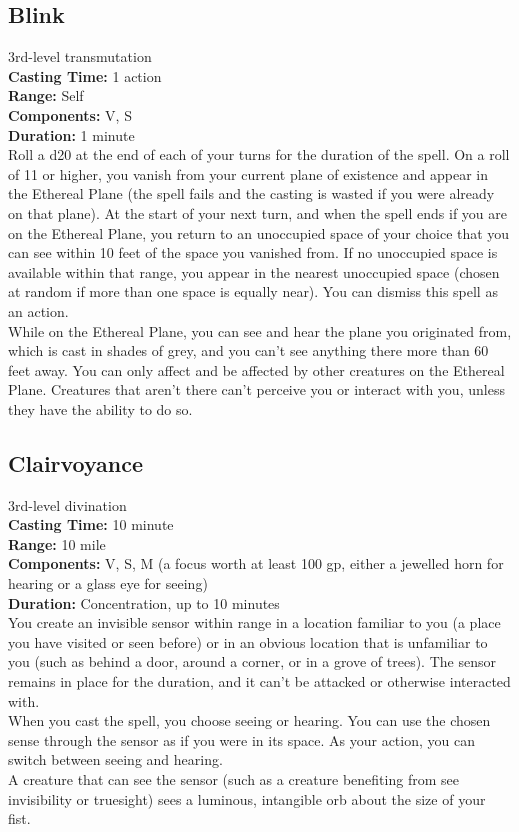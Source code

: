 \documentclass[11pt, A4paper, english]{article}
\begin{document}
		\subsection{Blink}
3rd-level transmutation \\
\textbf{Casting Time:} 1 action \\
\textbf{Range:} Self \\
\textbf{Components:} V, S \\
\textbf{Duration:} 1 minute \\
Roll a d20 at the end of each of your turns for the duration of the spell. On a roll of 11 or higher, you vanish from your current plane of existence and appear in the Ethereal Plane (the spell fails and the casting is wasted if you were already on that plane). At the start of your next turn, and when the spell ends if you are on the Ethereal Plane, you return to an unoccupied space of your choice that you can see within 10 feet of the space you vanished from. If no unoccupied space is available within that range, you appear in the nearest unoccupied space (chosen at random if more than one space is equally near). You can dismiss this spell as an action. \\
While on the Ethereal Plane, you can see and hear the plane you originated from, which is cast in shades of grey, and you can't see anything there more than 60 feet away. You can only affect and be affected by other creatures on the Ethereal Plane. Creatures that aren't there can't perceive you or interact with you, unless they have the ability to do so.

		\subsection{Clairvoyance}
3rd-level divination \\
\textbf{Casting Time:} 10 minute \\
\textbf{Range:} 10 mile \\
\textbf{Components:} V, S, M (a focus worth at least 100 gp, either a jewelled horn for hearing or a glass eye for seeing) \\
\textbf{Duration:} Concentration, up to 10 minutes \\
You create an invisible sensor within range in a location familiar to you (a place you have visited or seen before) or in an obvious location that is unfamiliar to you (such as behind a door, around a corner, or in a grove of trees). The sensor remains in place for the duration, and it can’t be attacked or otherwise interacted with. \\
When you cast the spell, you choose seeing or hearing. You can use the chosen sense through the sensor as if you were in its space. As your action, you can switch between seeing and hearing. \\
A creature that can see the sensor (such as a creature benefiting from see invisibility or truesight) sees a luminous, intangible orb about the size of your fist.
\end{document}

